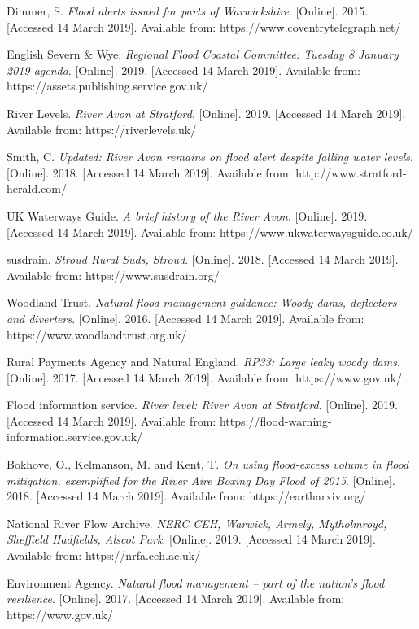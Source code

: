 \documentclass[11pt,a4paper]{article}
\begin{document}
\begin{thebibliography}{}
Dimmer, S. \textit{Flood alerts issued for parts of Warwickshire}. [Online]. 2015. [Accessed 14 March 2019]. Available from: https://www.coventrytelegraph.net/

English Severn \& Wye. \textit{Regional Flood Coastal Committee: Tuesday 8 January 2019 agenda}. [Online]. 2019. [Accessed 14 March 2019]. Available from: https://assets.publishing.service.gov.uk/

River Levels. \textit{River Avon at Stratford}. [Online]. 2019. [Accessed 14 March 2019]. Available from: https://riverlevels.uk/

Smith, C. \textit{Updated: River Avon remains on flood alert despite falling water levels}. [Online]. 2018. [Accessed 14 March 2019]. Available from: http://www.stratford-herald.com/

UK Waterways Guide. \textit{A brief history of the River Avon}. [Online]. 2019. [Accessed 14 March 2019]. Available from: https://www.ukwaterwaysguide.co.uk/

\bibitem{}
susdrain. \textit{Stroud Rural Suds, Stroud}. [Online]. 2018. [Accessed 14 March 2019]. Available from: https://www.susdrain.org/

\bibitem{}
Woodland Trust. \textit{Natural flood management guidance: Woody dams, deflectors and diverters}. [Online]. 2016. [Accessed 14 March 2019]. Available from: https://www.woodlandtrust.org.uk/

Rural Payments Agency and Natural England. \textit{RP33: Large leaky woody dams}. [Online]. 2017. [Accessed 14 March 2019]. Available from: https://www.gov.uk/

Flood information service. \textit{River level: River Avon at Stratford}. [Online]. 2019. [Accessed 14 March 2019]. Available from: https://flood-warning-information.service.gov.uk/

Bokhove, O., Kelmanson, M. and Kent, T. \textit{On using flood-excess volume in flood mitigation, exemplified for the River Aire Boxing Day Flood of 2015}. [Online]. 2018. [Accessed 14 March 2019]. Available from: https://eartharxiv.org/

National River Flow Archive. \textit{NERC CEH, Warwick, Armely, Mytholmroyd, Sheffield Hadfields, Alscot Park}. [Online]. 2019. [Accessed 14 March 2019]. Available from: https://nrfa.ceh.ac.uk/

\bibitem{}
Environment Agency. \textit{Natural flood management – part of the nation’s flood resilience}. [Online]. 2017. [Accessed 14 March 2019]. Available from: https://www.gov.uk/


\end{thebibliography}
\end{document}
